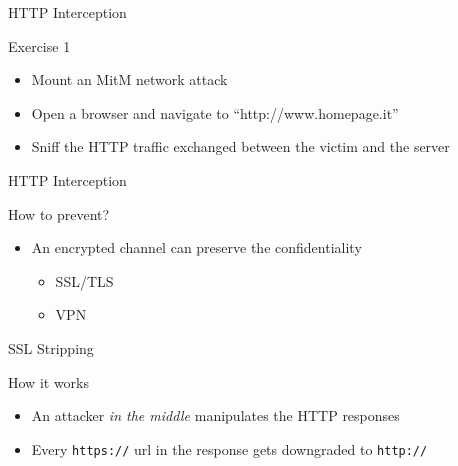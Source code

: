 \documentclass{beamer}
\begin{document}
\begin{frame}{HTTP Interception}
  \begin{block}{Exercise 1}
    \begin{itemize}
      \item Mount an MitM network attack
      \item Open a browser and navigate to ``http://www.homepage.it''
      \item Sniff the HTTP traffic exchanged between the victim and the server
    \end{itemize}
  \end{block}
\end{frame}

\begin{frame}{HTTP Interception}
  \begin{block}{How to prevent?}
  \pause
  \begin{itemize}
    \item An encrypted channel can preserve the confidentiality
    \begin{itemize}
      \item SSL/TLS
      \item VPN
    \end{itemize}
  \end{itemize}
  \end{block}
\end{frame}

\begin{frame}{SSL Stripping}
  \begin{block}{How it works}
    \begin{itemize}
      \item An attacker \textit{in the middle} manipulates the HTTP responses
      \item Every \texttt{https://} url in the response gets downgraded to \texttt{http://}
    \end{itemize}
  \end{block}
\end{frame}
\end{document}
